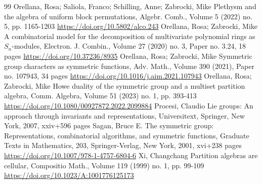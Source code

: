 \documentclass[10pt]{amsart}
\theoremstyle{definition}
\theoremstyle{definition}
\theoremstyle{plain}
\theoremstyle{remark}
\theoremstyle{plain}
\theoremstyle{plain}
\begin{document}
\begin{thebibliography}{99}
 Orellana, Rosa; Saliola, Franco; Schilling, Anne; Zabrocki, Mike Plethysm and the algebra of uniform block permutations, Algebr. Comb., Volume 5 (2022) no. 5, pp. 1165-1203 \url{https://doi.org/10.5802/alco.243}
 Orellana, Rosa; Zabrocki, Mike A combinatorial model for the decomposition of multivariate polynomial rings as $S_n$-modules, Electron. J. Combin., Volume 27 (2020) no. 3, Paper no. 3.24, 18 pages \url{https://doi.org/10.37236/8935}
 Orellana, Rosa; Zabrocki, Mike Symmetric group characters as symmetric functions, Adv. Math., Volume 390 (2021), Paper no. 107943, 34 pages \url{https://doi.org/10.1016/j.aim.2021.107943}
 Orellana, Rosa; Zabrocki, Mike Howe duality of the symmetric group and a multiset partition algebra, Comm. Algebra, Volume 51 (2023) no. 1, pp. 393-413 \url{https://doi.org/10.1080/00927872.2022.2099884}
 Procesi, Claudio Lie groups: An approach through invariants and representations, Universitext, Springer, New York, 2007, xxiv+596 pages
 Sagan, Bruce E. The symmetric group: Representations, combinatorial algorithms, and symmetric functions, Graduate Texts in Mathematics, 203, Springer-Verlag, New York, 2001, xvi+238 pages \url{https://doi.org/10.1007/978-1-4757-6804-6}
 Xi, Changchang Partition algebras are cellular, Compositio Math., Volume 119 (1999) no. 1, pp. 99-109 \url{https://doi.org/10.1023/A:1001776125173}
\end{thebibliography}
\end{document}
